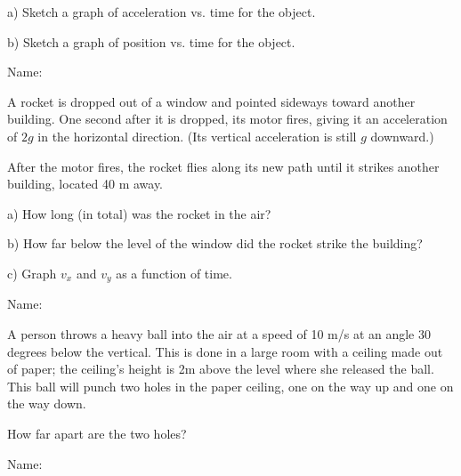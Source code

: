 \documentclass[12pt]{article}
\begin{document}
a) Sketch a graph of acceleration vs. time for the object.
\vspace{2.2in}

b) Sketch a graph of position vs. time for the object.


\newpage

\begin{flushright}
Name: \underline{\hspace{3in}}
        \end{flushright}

        \Large \centerline{}
        \normalsize
        \rm

A rocket is dropped out of a window and pointed sideways toward another building. One
second after it is dropped, its motor fires, giving it an acceleration of $2g$ in the horizontal
direction. (Its vertical acceleration is still $g$ downward.)

After the motor fires, the rocket flies along its new path until it strikes another building,
located 40 m away.

\it \bigskip

a) How long (in total) was the rocket in the air?

\vspace{1.5in}


b) How far below the level of the window did the rocket strike the building?

\vspace{1.5in}

c) Graph $v_x$ and $v_y$ as a function of time.

\newpage

\begin{flushright}
Name: \underline{\hspace{3in}}
        \end{flushright}

        \Large \centerline{}
        \normalsize
        \rm

A person throws a heavy ball into the air at a speed of 10 m/s at an angle 30 degrees below the
vertical. This is done in a large room with a ceiling made out of paper; the ceiling’s height is
2m above the level where she released the ball. This ball will punch two holes in the paper
ceiling, one on the way up and one on the way down. 

\it

How far apart are the two holes?


\newpage

\begin{flushright}
Name: \underline{\hspace{3in}}
        \end{flushright}
\end{document}
